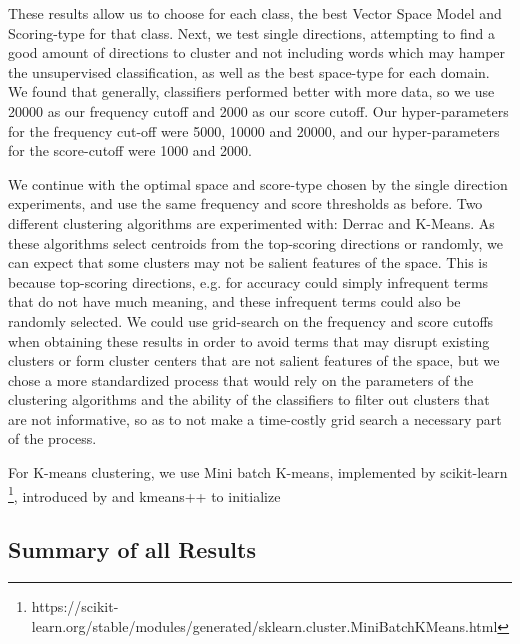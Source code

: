 These results allow us to choose for each class, the best Vector Space Model and Scoring-type for that class.
Next, we test single directions, attempting to find a good amount of directions to cluster and not including words which may hamper the unsupervised classification, as well as the best space-type for each domain. We found that generally,  classifiers performed better with more data, so we use 20000 as our frequency cutoff and 2000 as our score cutoff. Our hyper-parameters for the frequency cut-off were 5000, 10000 and 20000, and our hyper-parameters for the score-cutoff were 1000 and 2000.

We continue with the optimal space and score-type chosen by the single direction experiments, and use the same frequency and score thresholds as before. Two different clustering algorithms are experimented with: Derrac and K-Means. As these algorithms select centroids from the top-scoring directions or randomly, we can expect that some clusters may not be salient features of the space. This is because top-scoring directions, e.g. for accuracy could simply infrequent terms that do not have much meaning, and these infrequent terms could also be randomly selected. We could use grid-search on the frequency and score cutoffs when obtaining these results in order to avoid terms that may disrupt existing clusters or form cluster centers that are not salient features of the space, but we chose a more standardized process that would rely on the parameters of the clustering algorithms and the ability of the classifiers to filter out clusters that are not informative, so as to not make a time-costly grid search a necessary part of the process.


For K-means clustering, we use Mini batch K-means, implemented by scikit-learn \footnote{https://scikit-learn.org/stable/modules/generated/sklearn.cluster.MiniBatchKMeans.html}, introduced by \cite{Sculley2010} and kmeans++ to initialize \cite{Arthur}

\subsection{Summary of all Results}

